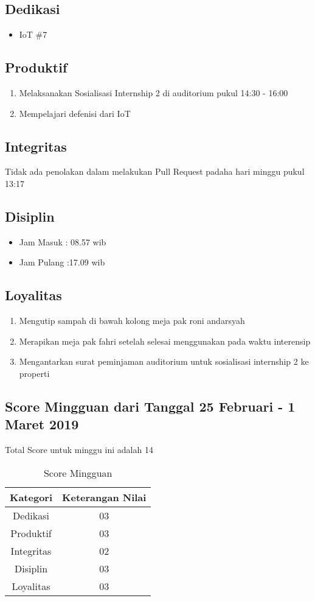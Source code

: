 \subsection{Dedikasi}
\begin{itemize}
\item IoT \#7
\end{itemize}
\subsection{Produktif}
\begin{enumerate}
\item Melaksanakan Sosialisasi Internship 2 di auditorium pukul 14:30 - 16:00 
\item Mempelajari defenisi dari IoT
\end{enumerate}
\subsection{Integritas}
Tidak ada penolakan dalam melakukan Pull Request padaha hari minggu pukul 13:17
\subsection{Disiplin}
\begin{itemize}
\item Jam Masuk : 08.57 wib
\item Jam Pulang :17.09 wib
\end{itemize}
\subsection{Loyalitas}
\begin{enumerate}
\item Mengutip sampah di bawah kolong meja pak roni andarsyah
\item Merapikan meja pak fahri setelah selesai menggunakan pada waktu interensip
\item Mengantarkan surat peminjaman auditorium untuk sosialisasi internship 2 ke properti
\end{enumerate}


\subsection{Score Mingguan dari Tanggal 25 Februari - 1 Maret 2019}
Total Score untuk minggu ini adalah 14

\begin{table}[h]
\caption{Score Mingguan}
\centering
\begin{tabular}{|c|c|}
\hline
\textbf{Kategori}&\textbf{Keterangan Nilai}\\
\hline
Dedikasi&03\\
\hline
Produktif&03\\
\hline
Integritas&02\\
\hline
Disiplin&03\\
\hline
Loyalitas&03\\
\hline
\end{tabular}
\label{table:score mingguan}
\end{table}


